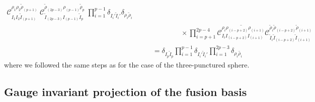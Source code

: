 \documentclass[nofootinbib,superscriptaddress,eqsecnum,tightenlines,11pt]{revtex4-1}
\def\nn{\nonumber}
\def\q{\qquad}
\renewcommand{\tilde}{\widetilde}
\begin{document}
\begin{align}
	 \mathcal{C}^{{\rho}_1 {\rho}_2\tilde{\rho}_{(p+1)}}_{{I}_1{I}_2\tilde{I}_{(p+1)}}\;
	\mathcal{C}^{\tilde{\rho}_{(2p-3)}{\rho}_{(p-1)}\tilde{\rho}_p}_{\tilde{I}_{(2p-3)}{I}_{(p-1)}\tilde{I}_p}\; \prod_{i=1}^{p-1}\delta_{I_i'\tilde{I}_i'}\delta_{\rho_i\tilde{\rho}_i}\\ \nn
	& \q \q \q \times \prod_{i=p+1}^{2p-4}\overline{\mathcal{C}^{\rho_i\rho_{(i-p+2)}\rho_{(i+1)}}_{I_iI_{(i-p+2)}I_{(i+1)}}}
	\mathcal{C}^{\tilde{\rho}_i\tilde{\rho}_{(i-p+2)}\tilde{\rho}_{(i+1)}}_{\tilde{I}_i\tilde{I}_{(i-p+2)}\tilde{I}_{(i+1)}} \\ 
	&\q = \delta_{I_p\tilde{I}_p}\prod_{i=1}^{p-1}\delta_{I_i'\tilde{I}_i'}\prod_{i=1}^{2p-3}\delta_{\rho_i\tilde{\rho_i}}
\end{align}  
where we followed the same steps as for the case of the three-punctured sphere.









\subsection{Gauge invariant projection  of the fusion basis} \label{PfusionA}
\end{document}
